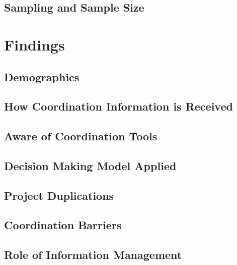 \documentclass[
]{book}
\begin{document}
\hypertarget{sampling-and-sample-size}{%
\section{Sampling and Sample Size}\label{sampling-and-sample-size}}

\hypertarget{findings}{%
\chapter{Findings}\label{findings}}

\hypertarget{demographics}{%
\section{Demographics}\label{demographics}}

\hypertarget{how-coordination-information-is-received}{%
\section{How Coordination Information is Received}\label{how-coordination-information-is-received}}

\hypertarget{aware-of-coordination-tools}{%
\section{Aware of Coordination Tools}\label{aware-of-coordination-tools}}

\hypertarget{decision-making-model-applied}{%
\section{Decision Making Model Applied}\label{decision-making-model-applied}}

\hypertarget{project-duplications}{%
\section{Project Duplications}\label{project-duplications}}

\hypertarget{coordination-barriers}{%
\section{Coordination Barriers}\label{coordination-barriers}}

\hypertarget{role-of-information-management}{%
\section{Role of Information Management}\label{role-of-information-management}}
\end{document}

